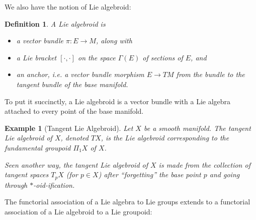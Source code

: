 \documentclass{tufte-handout}
\newtheorem{example}{Example}
\newtheorem{defn}{Definition}
\begin{document}
We also have the notion of Lie algebroid:
\begin{defn}
A \emph{Lie algebroid} is
\begin{itemize}
\item a vector bundle $\pi: E \to M$, along with
\item a Lie bracket $[\cdot,\cdot]$ on the space $\Gamma(E)$ of sections of $E$, and
\item an \emph{anchor}, i.e. a vector bundle morphism $E \to TM$ from the bundle to the tangent bundle of the base manifold.
\end{itemize}
\end{defn}
To put it succinctly, a Lie algebroid is a vector bundle with a Lie algebra attached to every point of the base manifold.

\begin{example}[Tangent Lie Algebroid]
Let $X$ be a smooth manifold. The \emph{tangent Lie algebroid} of $X$, denoted $TX$, is the Lie algebroid corresponding to the fundamental groupoid $\Pi_1 X$ of $X$.

Seen another way, the tangent Lie algebroid of $X$ is made from the collection of tangent spaces $T_p X$ (for $p \in X$) after ``forgetting'' the base point $p$ and going through $*$-oid-ification.%
\end{example}

The functorial association of a Lie algebra to Lie groups extends to a functorial association of a Lie algebroid to a Lie groupoid:
\end{document}
